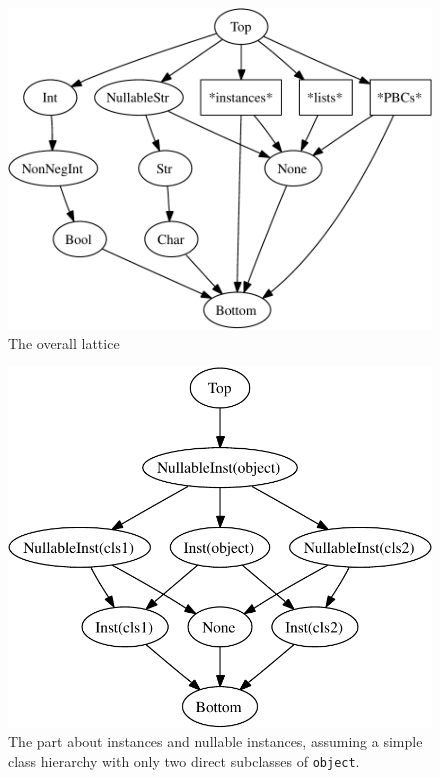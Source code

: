 \documentclass{acm_proc_article-sp}
\begin{document}
\begin{figure}
\centering
\includegraphics[scale=0.75]{image/lattice1.pdf}
\caption{The overall lattice}
\label{latticeoverall}
\end{figure}

\begin{figure}
\centering
\includegraphics[scale=0.75]{image/lattice2.pdf}
\caption{The part about instances and nullable instances, assuming a
  simple class hierarchy with only two direct subclasses of
  \texttt{object}.}
\label{latticedetail}
\end{figure}
\end{document}
